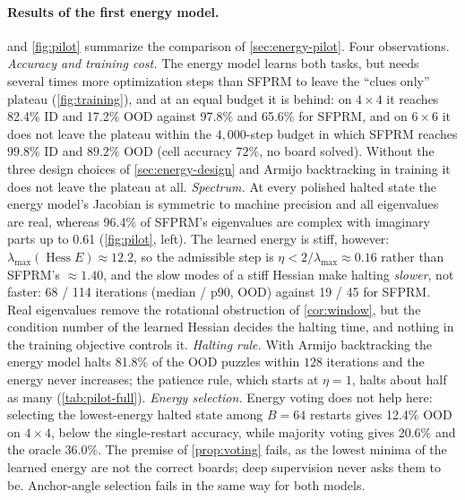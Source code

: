 \paragraph{Results of the first energy model.}
 and \cref{fig:pilot} summarize the comparison of \cref{sec:energy-pilot}. Four
observations. \emph{Accuracy and training cost.} The energy model learns both tasks, but needs several times more
optimization steps than SFPRM to leave the ``clues only'' plateau (\cref{fig:training}), and at an
equal budget it is behind: on $4\times4$ it reaches 82.4\% ID and 17.2\% OOD against 97.8\% and
65.6\% for SFPRM, and on $6\times6$ it does not leave the plateau within the $4{,}000$-step budget in which SFPRM reaches $99.8\%$ ID and $89.2\%$ OOD (cell accuracy $72\%$, no board solved). Without the three design choices of
\cref{sec:energy-design} and Armijo backtracking in training it does not leave the plateau at all.
\emph{Spectrum.} At every polished halted state the energy model's Jacobian is symmetric to
machine precision and all eigenvalues are real, whereas 96.4\% of SFPRM's eigenvalues are complex
with imaginary parts up to 0.61 (\cref{fig:pilot}, left). The learned energy is stiff, however:
$\lambda_{\max}(\operatorname{Hess}E)\approx 12.2$, so the admissible step is
$\eta<2/\lambda_{\max}\approx 0.16$ rather than SFPRM's $\approx 1.40$, and the slow modes of a
stiff Hessian make halting \emph{slower}, not faster: 68 / 114 iterations (median / p90, OOD) against
19 / 45 for SFPRM. Real eigenvalues remove the rotational obstruction of \cref{cor:window}, but the
condition number of the learned Hessian decides the halting time, and nothing in the training
objective controls it. \emph{Halting rule.} With Armijo backtracking the energy model halts
81.8\% of the OOD puzzles within $128$ iterations and the energy never increases; the patience rule,
which starts at $\eta=1$, halts about half as many (\cref{tab:pilot-full}).
\emph{Energy selection.} Energy voting does not help here: selecting the lowest-energy halted
state among $B=64$ restarts gives 12.4\% OOD on $4\times4$, below the single-restart accuracy, while
majority voting gives 20.6\% and the oracle 36.0\%. The premise of \cref{prop:voting} fails, as the
lowest minima of the learned energy are not the correct boards; deep supervision never asks them
to be. Anchor-angle selection fails in the same way for both models.

